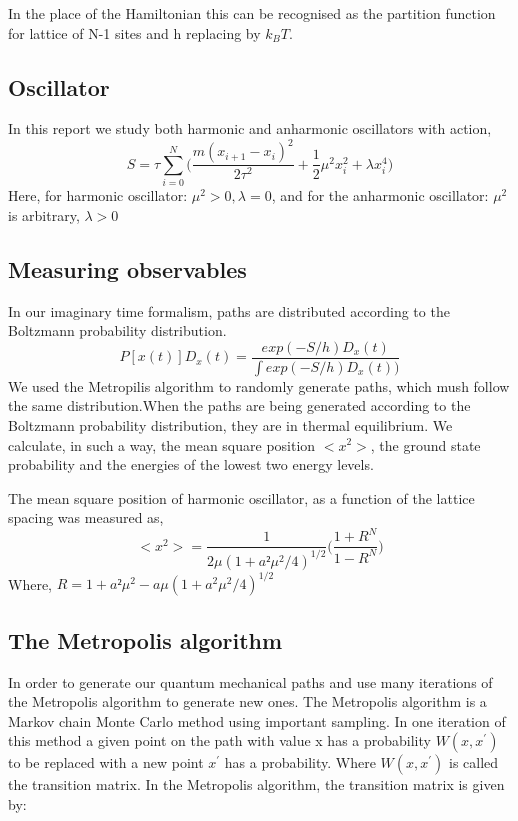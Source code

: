 \documentclass{article}
\begin{document}
\noindent
In the place of the Hamiltonian this can be recognised as the partition function for lattice of N-1 sites and h replacing by $k_BT$.

\subsection{Oscillator}
In this report we study both harmonic and anharmonic oscillators with action,
\begin{equation}
S= \tau\sum_{i=0}^{N}\bigg( \frac{ m(x_{i+1} -x_i)^2}{2\tau^2} + \frac {1}{2}\mu^2x_i^2 +\lambda x_i^4\bigg)
\end{equation}
Here, for harmonic oscillator: $\mu^2>0,  \lambda=0$, and for the anharmonic oscillator: $\mu^2$ is arbitrary,  $\lambda>0$

\subsection{Measuring observables}
In our imaginary time formalism, paths are distributed according to the Boltzmann probability distribution.
\begin{equation}
P[x(t)]D_x(t)=\frac{exp(-S/h)D_x(t)}{\int exp(-S/h)D_x(t))}
\end{equation}
We used the Metropilis algorithm to randomly generate paths, which mush follow the same distribution.When the paths are being generated according to the Boltzmann probability distribution, they are in thermal equilibrium. We calculate, in such a way, the mean square position $<x^2>$, the ground state probability and the energies of the lowest two energy levels.

The mean square position of harmonic oscillator, as a function of the lattice spacing was measured as,
\begin{equation}
<x^2> = \frac {1}{2\mu(1+a²\mu^2/4)^{1/2}} \bigg( \frac {1+R^N}{1-R^N}\bigg)
\end{equation}{\normalsize {\normalsize }}
Where,  $R= 1+a²\mu^2-a\mu(1+a^2\mu^2/4)^{1/2}$

\subsection{The Metropolis algorithm}
In order to generate our quantum mechanical paths and use many iterations of the Metropolis algorithm to generate new ones. The Metropolis algorithm is a Markov chain Monte Carlo method using important sampling. In one iteration of this method a given point on the path with value x has a probability $W(x, x^\prime)$ to be replaced with a new point $x^\prime$ has a probability. Where $W(x, x^\prime)$ is called the transition matrix. In the Metropolis algorithm, the transition matrix is given by:
\end{document}
